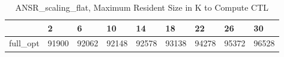\begin{table}
\caption{ANSR\_scaling\_flat, Maximum Resident Size in K to Compute CTL}
\label{ANSR_scaling_flat_CTL_size}
\begin{tabular}{lllllllll}
\toprule
 & 2 & 6 & 10 & 14 & 18 & 22 & 26 & 30 \\
\midrule
full\_opt & 91900 & 92062 & 92148 & 92578 & 93138 & 94278 & 95372 & 96528 \\
\bottomrule
\end{tabular}
\end{table}
